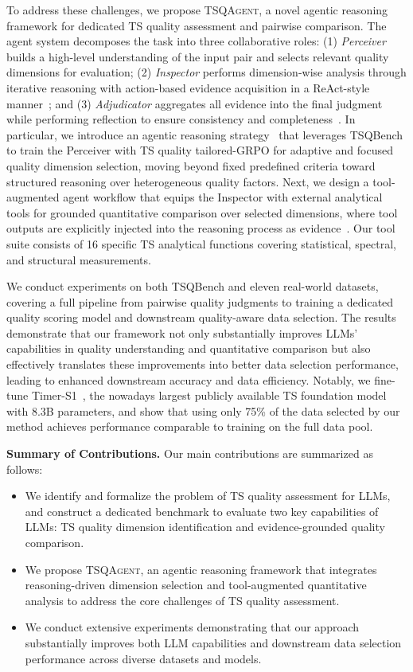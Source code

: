 \documentclass{article}
\newcommand{\partitle}[1]{\smallskip \noindent \textbf{#1.}}
\begin{document}
To address these challenges, we propose \textsc{TSQAgent}, a novel agentic reasoning framework for dedicated TS quality assessment and pairwise comparison. The agent system decomposes the task into three collaborative roles: (1) \emph{Perceiver} builds a high-level understanding of the input pair and selects relevant quality dimensions for evaluation; (2) \emph{Inspector} performs dimension-wise analysis through iterative reasoning with action-based evidence acquisition in a ReAct-style manner~\citep{yao2023react}; and (3) \emph{Adjudicator} aggregates all evidence into the final judgment while performing reflection to ensure consistency and completeness~\citep{abbas2025pitch,li2025flow}.
In particular, we introduce an agentic reasoning strategy~\citep{shao2024deepseekmath} that leverages TSQBench to train the Perceiver with TS quality tailored-GRPO for adaptive and focused quality dimension selection, moving beyond fixed predefined criteria toward structured reasoning over heterogeneous quality factors. Next, we design a tool-augmented agent workflow that equips the Inspector with external analytical tools for grounded quantitative comparison over selected dimensions, where tool outputs are explicitly injected into the reasoning process as evidence~\citep{wei2026agentic,zhang2026recthinker}. Our tool suite consists of 16 specific TS analytical functions covering statistical, spectral, and structural measurements.

We conduct experiments on both TSQBench and eleven real-world datasets, covering a full pipeline from pairwise quality judgments to training a dedicated quality scoring model and downstream quality-aware data selection. The results demonstrate that our framework not only substantially improves LLMs’ capabilities in quality understanding and quantitative comparison but also effectively translates these improvements into better data selection performance, leading to enhanced downstream accuracy and data efficiency. Notably, we fine-tune Timer-S1~\citep{liu2026timer}, the nowadays largest publicly available TS foundation model with 8.3B parameters, and show that using only 75\% of the data selected by our method achieves performance comparable to training on the full data pool.

\partitle{Summary of Contributions} Our main contributions are summarized as follows:
\begin{itemize}[leftmargin=*]
    \item We identify and formalize the problem of TS quality assessment for LLMs, and construct a dedicated benchmark to evaluate two key capabilities of LLMs: TS quality dimension identification and evidence-grounded quality comparison.
    \item We propose \textsc{TSQAgent}, an agentic reasoning framework that integrates reasoning-driven dimension selection and tool-augmented quantitative analysis to address the core challenges of TS quality assessment.
    \item We conduct extensive experiments demonstrating that our approach substantially improves both LLM capabilities and downstream data selection performance across diverse datasets and models.
\end{itemize}
\end{document}
